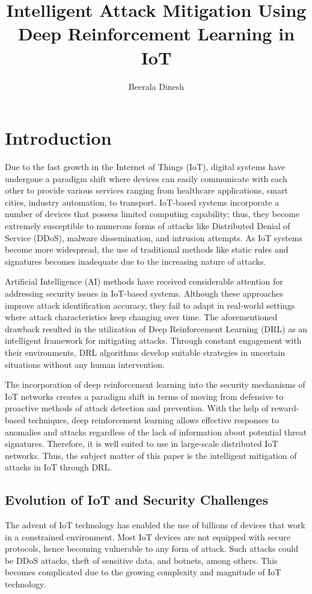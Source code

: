 \documentclass[12pt]{article}
\title{Intelligent Attack Mitigation Using Deep
Reinforcement Learning in IoT
}
\author{Beerala Dinesh}
\date{}
\begin{document}
	\maketitle
	
	\section{Introduction}
	Due to the fast growth in the Internet of Things (IoT), digital systems have undergone a paradigm shift where devices can easily communicate with each other to provide various services ranging from healthcare applications, smart cities, industry automation, to transport. IoT-based systems incorporate a number of devices that possess limited computing capability; thus, they become extremely susceptible to numerous forms of attacks like Distributed Denial of Service (DDoS), malware dissemination, and intrusion attempts. As IoT systems become more widespread, the use of traditional methods like static rules and signatures becomes inadequate due to the increasing nature of attacks.

Artificial Intelligence (AI) methods have received considerable attention for addressing security issues in IoT-based systems. Although these approaches improve attack identification accuracy, they fail to adapt in real-world settings where attack characteristics keep changing over time. The aforementioned drawback resulted in the utilization of Deep Reinforcement Learning (DRL)\cite{Sewak2023} as an intelligent framework for mitigating attacks. Through constant engagement with their environments, DRL algorithms develop suitable strategies in uncertain situations without any human intervention.

The incorporation of deep reinforcement\cite{Shakya} learning into the security mechanisms of IoT networks creates a paradigm shift in terms of moving from defensive to proactive methods of attack detection and prevention. With the help of reward-based techniques, deep reinforcement learning allows effective responses to anomalies and attacks regardless of the lack of information about potential threat signatures. Therefore, it is well suited to use in large-scale distributed IoT networks. Thus, the subject matter of this paper is the intelligent mitigation of attacks in IoT through DRL.
	\subsection{Evolution of IoT and Security Challenges}
    The advent of IoT technology has enabled the use of billions of devices that work in a constrained environment. Most IoT devices are not equipped with secure protocols, hence becoming vulnerable to any form of attack. Such attacks could be DDoS attacks, theft of sensitive data, and botnets, among others. This becomes complicated due to the growing complexity and magnitude of IoT technology.
\end{document}
